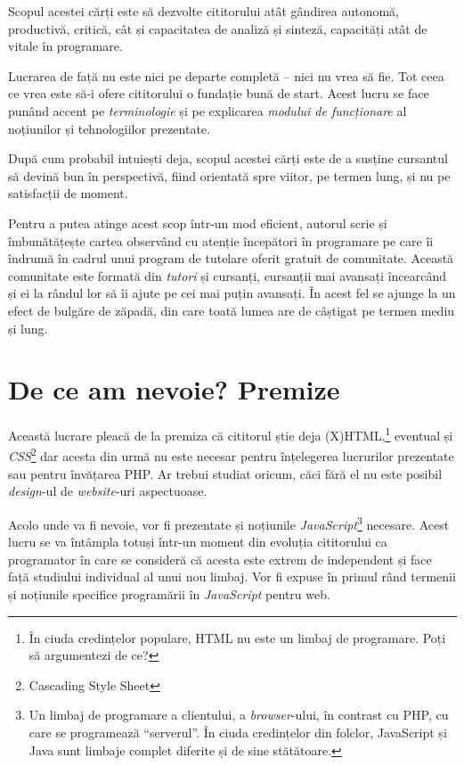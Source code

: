 Scopul acestei cărți este să dezvolte cititorului atât gândirea autonomă,
productivă, critică, cât și capacitatea de analiză și sinteză, capacități atât
de vitale în programare.

Lucrarea de față nu este nici pe departe completă -- nici nu vrea să fie.  Tot
ceea ce vrea este să-i ofere cititorului o fundație bună de start. Acest lucru
se face punând accent pe \textit{terminologie} și pe explicarea \textit{modului
de funcționare} al noțiunilor și tehnologiilor prezentate.

După cum probabil intuiești deja, scopul acestei cărți este de a susține
cursantul să devină bun în perspectivă, fiind orientată spre viitor, pe termen
lung, și nu pe satisfacții de moment.

Pentru a putea atinge acest scop într-un mod eficient, autorul scrie și
îmbunătățește cartea observând cu atenție începători în programare pe care îi
îndrumă în cadrul unui program de tutelare oferit gratuit de comunitate.
Această comunitate este formată din \textit{tutori} și cursanți, cursanții mai
avansați încearcând și ei la rândul lor să îi ajute pe cei mai puțin avansați.
În acest fel se ajunge la un efect de bulgăre de zăpadă, din care toată lumea
are de câștigat pe termen mediu și lung.

\section*{De ce am nevoie? Premize}
{}

Această lucrare pleacă de la premiza că cititorul știe deja
(X)HTML,\footnote{În ciuda credințelor populare, HTML nu este un limbaj de
programare. Poți să argumentezi de ce?} eventual și
\textsl{CSS}\footnote{Cascading Style Sheet}
dar acesta din urmă nu este necesar pentru
înțelegerea lucrurilor prezentate sau pentru învățarea PHP. Ar trebui studiat
oricum, căci fără el nu este posibil
\textsl{design}-ul
de \textit{website}-uri aspectuoase.

Acolo unde va fi nevoie, vor fi prezentate și noțiunile
\textsl{JavaScript}\footnote{Un
limbaj de programare a clientului, a \textsl{browser}-ului, în contrast cu PHP,
cu care se programează ``serverul''.  În ciuda credințelor din folclor,
JavaScript și Java sunt limbaje complet diferite și de sine stătătoare.}
necesare. Acest lucru se va întâmpla totuși într-un moment din evoluția
cititorului ca programator în care se consideră că acesta este extrem de
independent și face față studiului individual al unui nou limbaj. Vor fi expuse
în primul rând termenii și noțiunile specifice programării în
\textit{JavaScript} pentru web.

